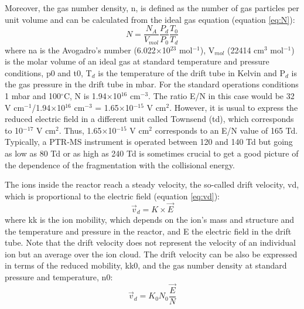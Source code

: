 Moreover, the gas number density, \acrshort{n}, is defined as the number of gas particles per unit volume and can be calculated from the ideal gas equation (equation \ref{eq:N}):
\begin{equation}
N = \frac{N_A}{V_{mol}}\frac{P_d}{P_0}\frac{T_0}{T_d}
\label{eq:N}
\end{equation}
where \acrshort{na} is the Avogadro's number (6.022$\times$10$^{23}$ mol$^{-1}$), V$_{mol}$ (22414 cm$^{3}$ mol$^{-1}$) is the molar volume of an ideal gas at standard temperature and pressure conditions, \acrshort{p0}  and \acrshort{t0}, T$_d$ is the temperature of the drift tube in Kelvin and P$_d$ is the gas pressure in the drift tube in mbar. For the standard operations conditions 1 mbar and 100$^{\circ}$C, N is 1.94$\times$10$^{16}$ cm$^{-3}$. The ratio E/N in this case would be 32 V cm$^{-1}$/1.94$\times$10$^{16}$ cm$^{-3}$ = 1.65$\times$10$^{-15}$ V cm$^{2}$. However, it is usual to express the reduced electric field in a different unit called Townsend (\acrshort{td}), which corresponds to 10$^{-17}$ V cm$^{2}$. Thus, 1.65$\times$10$^{-15}$ V cm$^{2}$ corresponds to an E/N value of 165 Td. Typically, a PTR-MS instrument is operated between 120 and 140 Td but going as low as 80 Td or as high as 240 Td is sometimes crucial to get a good picture of the dependence of the fragmentation with the collisional energy.

The ions inside the reactor reach a steady velocity, the so-called drift velocity, \acrshort{vd}, which is proportional to the electric field (equation \ref{eq:vd}):
\begin{equation}
\vec{v}_d = K\times \vec{E}
\label{eq:vd}
\end{equation}
where \acrshort{kk} is the ion mobility, which depends on the ion's mass and structure and the temperature and pressure in the reactor, and E the electric field in the drift tube. Note that the drift velocity does not represent the velocity of an individual ion but an average over the ion cloud. The drift velocity can be also be expressed in terms of the reduced mobility, \acrshort{kk0}, and the gas number density at standard pressure and temperature, \acrshort{n0}:
\begin{equation}
\vec{v}_d = K_0 N_0 \frac{\vec{E}}{N}
\label{eq:vd2}
\end{equation}


